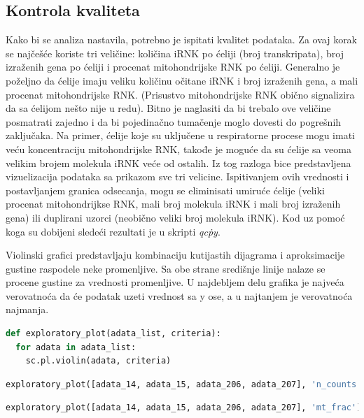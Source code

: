\documentclass{article}
\begin{document}
\subsection{Kontrola kvaliteta}

Kako bi se analiza nastavila, potrebno je ispitati kvalitet podataka. Za ovaj korak se najčešće koriste tri veličine: količina iRNK po ćeliji (broj transkripata), broj izraženih gena po ćeliji i procenat mitohondrijske RNK po ćeliji\cite{luecken2019current}. Generalno je poželjno da ćelije imaju veliku količinu očitane iRNK i broj izraženih gena, a mali procenat mitohondrijske RNK. (Prisustvo mitohondrijske RNK obično signalizira da sa ćelijom nešto nije u redu\cite{ilicic2016classification}). Bitno je naglasiti da bi trebalo ove veličine posmatrati zajedno i da bi pojedinačno tumačenje moglo dovesti do pogrešnih zaključaka. Na primer, ćelije koje su uključene u respiratorne procese mogu imati veću koncentraciju mitohondrijske RNK, takođe je moguće da su ćelije sa veoma velikim brojem molekula iRNK veće od ostalih. Iz tog razloga bice predstavljena vizuelizacija podataka sa prikazom sve tri velicine. Ispitivanjem ovih vrednosti i postavljanjem granica odsecanja, mogu se eliminisati umiruće ćelije (veliki procenat mitohondrijkse RNK, mali broj molekula iRNK i mali broj izraženih gena) ili duplirani uzorci (neobično veliki broj molekula iRNK). Kod uz pomoć koga su dobijeni sledeći rezultati je u skripti \emph{qc\.py}.

Violinski grafici predstavljaju kombinaciju kutijastih dijagrama i aproksimacije gustine raspodele neke promenljive. Sa obe strane središnje linije nalaze se procene gustine za vrednosti promenljive. U najdebljem delu grafika je najveća verovatnoća da će podatak uzeti vrednost sa y ose, a u najtanjem je verovatnoća najmanja.

\begin{lstlisting}[language=python]
def exploratory_plot(adata_list, criteria):
  for adata in adata_list:
    sc.pl.violin(adata, criteria)
\end{lstlisting}

\begin{lstlisting}[language=python]
exploratory_plot([adata_14, adata_15, adata_206, adata_207], 'n_counts')
\end{lstlisting}

\begin{lstlisting}[language=python]
exploratory_plot([adata_14, adata_15, adata_206, adata_207], 'mt_frac')
\end{lstlisting}
\end{document}

